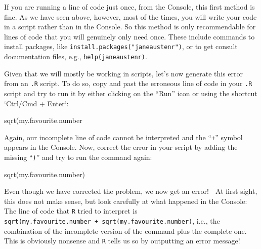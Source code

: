 \documentclass[
  letterpaper,
  DIV=11,
  numbers=noendperiod,
  oneside]{scrreprt}
\newenvironment{Shaded}{\begin{snugshade}}{\end{snugshade}}
\newcommand{\FunctionTok}[1]{\textcolor[rgb]{0.28,0.35,0.67}{#1}}
\newcommand{\NormalTok}[1]{\textcolor[rgb]{0.00,0.23,0.31}{#1}}
\begin{document}
If you are running a line of code just once, from the Console, this
first method is fine. As we have seen above, however, most of the times,
you will write your code in a script rather than in the Console. So this
method is only recommendable for lines of code that you will genuinely
only need once. These include commands to install packages, like
\texttt{install.packages("janeaustenr")}, or to get consult
documentation files, e.g., \texttt{help(janeaustenr)}.

Given that we will mostly be working in scripts, let's now generate this
error from an \texttt{.R} script. To do so, copy and past the erroneous
line of code in your \texttt{.R} script and try to run it by either
clicking on the ``Run'' icon or using the shortcut `Ctrl/Cmd + Enter`:

\begin{Shaded}
\begin{Highlighting}[]
\FunctionTok{sqrt}\NormalTok{(my.favourite.number}
\end{Highlighting}
\end{Shaded}

Again, our incomplete line of code cannot be interpreted and the
``\texttt{+}'' symbol appears in the Console. Now, correct the error in
your script by adding the missing ``\texttt{)}'' and try to run the
command again:

\begin{Shaded}
\begin{Highlighting}[]
\FunctionTok{sqrt}\NormalTok{(my.favourite.number)}
\end{Highlighting}
\end{Shaded}

Even though we have corrected the problem, we now get an error! 🤯 At
first sight, this does not make sense, but look carefully at what
happened in the Console: The line of code that \texttt{R} tried to
interpret is
\texttt{sqrt(my.favourite.number\ +\ sqrt(my.favourite.number)}, i.e.,
the combination of the incomplete version of the command plus the
complete one. This is obviously nonsense and \texttt{R} tells us so by
outputting an error message!
\end{document}
